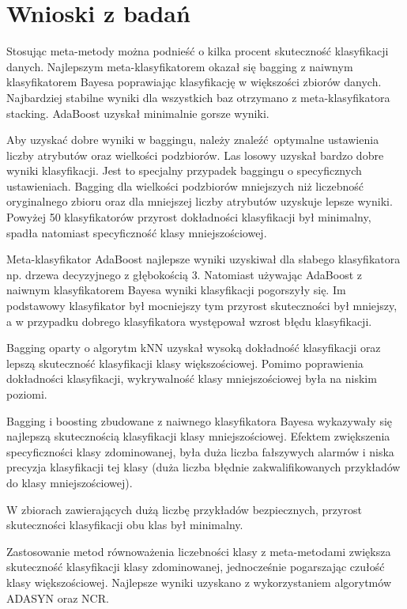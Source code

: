 \section{Wnioski z badań}
Stosując meta-metody można podnieść o kilka procent skuteczność klasyfikacji danych. Najlepszym meta-klasyfikatorem okazał się bagging z naiwnym klasyfikatorem Bayesa poprawiając klasyfikację w większości zbiorów danych. Najbardziej stabilne wyniki dla wszystkich baz otrzymano z meta-klasyfikatora stacking. AdaBoost uzyskał minimalnie gorsze wyniki. \par
Aby uzyskać dobre wyniki w baggingu, należy znaleźć optymalne ustawienia liczby atrybutów oraz wielkości podzbiorów. Las losowy uzyskał bardzo dobre wyniki klasyfikacji. Jest to specjalny przypadek baggingu o specyficznych ustawieniach. Bagging dla wielkości podzbiorów mniejszych niż liczebność oryginalnego zbioru oraz dla mniejszej liczby atrybutów uzyskuje lepsze wyniki. Powyżej 50 klasyfikatorów przyrost dokładności klasyfikacji był minimalny, spadła natomiast specyficzność klasy mniejszościowej.\par
Meta-klasyfikator AdaBoost najlepsze wyniki uzyskiwał dla słabego klasyfikatora np. drzewa decyzyjnego z głębokością 3. Natomiast używając AdaBoost z naiwnym klasyfikatorem Bayesa wyniki klasyfikacji pogorszyły się. Im podstawowy klasyfikator był mocniejszy tym przyrost skuteczności był mniejszy, a w przypadku dobrego klasyfikatora występował wzrost błędu klasyfikacji. \par
Bagging oparty o algorytm kNN uzyskał wysoką dokładność klasyfikacji oraz lepszą skuteczność klasyfikacji klasy większościowej. Pomimo poprawienia dokładności klasyfikacji, wykrywalność klasy mniejszościowej była na niskim poziomi. \par
Bagging i boosting zbudowane z naiwnego klasyfikatora Bayesa wykazywały się najlepszą skutecznością klasyfikacji klasy mniejszościowej. Efektem zwiększenia specyficzności klasy zdominowanej, była duża liczba fałszywych alarmów i niska precyzja klasyfikacji tej klasy (duża liczba błędnie zakwalifikowanych przykładów do klasy mniejszościowej). \par
W zbiorach zawierających dużą liczbę przykładów bezpiecznych, przyrost skuteczności klasyfikacji obu klas był minimalny. \par
Zastosowanie metod równoważenia liczebności klasy z meta-metodami zwiększa skuteczność klasyfikacji klasy zdominowanej, jednocześnie pogarszając czułość klasy większościowej. Najlepsze wyniki uzyskano z wykorzystaniem algorytmów ADASYN oraz NCR.